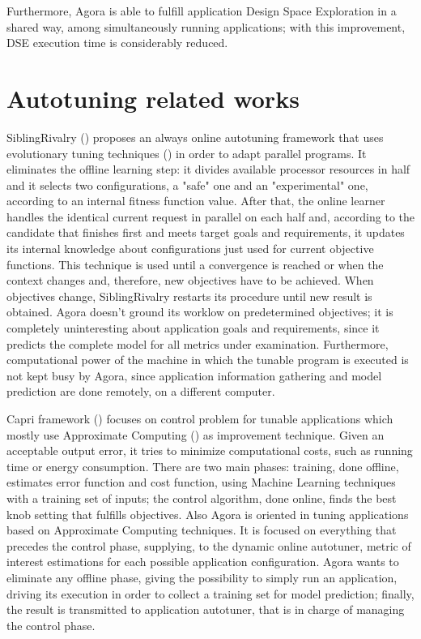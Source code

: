 Furthermore, Agora is able to fulfill application Design Space Exploration in a shared way, among simultaneously running applications; with this improvement, DSE execution time is considerably reduced. 

\section{Autotuning related works}

SiblingRivalry (\cite{ansel2012siblingrivalry}) proposes an always online autotuning framework that uses evolutionary tuning techniques (\cite{coello2007evolutionary}) in order to adapt parallel programs. It eliminates the offline learning step: it divides available processor resources in half and it selects two configurations, a "safe" one and an "experimental" one, according to an internal fitness function value. After that, the online learner handles the identical current request in parallel on each half and, according to the candidate that finishes first and meets target goals and requirements, it updates its internal knowledge about configurations just used for current objective functions. This technique is used until a convergence is reached or when the context changes and, therefore, new objectives have to be achieved. When objectives change, SiblingRivalry restarts its procedure until new result is obtained. Agora doesn't ground its worklow on predetermined objectives; it is completely uninteresting about application goals and requirements, since it predicts the complete model for all metrics under examination. Furthermore, computational power of the machine in which the tunable program is executed is not kept busy by Agora, since application information gathering and model prediction are done remotely, on a different computer.

Capri framework (\cite{sui2016proactive}) focuses on control problem for tunable applications which mostly use Approximate Computing (\cite{mittal2016survey}) as improvement technique. Given an acceptable output error, it tries to minimize computational costs, such as running time or energy consumption. There are two main phases: training, done offline, estimates error function and cost function, using Machine Learning techniques with a training set of inputs; the control algorithm, done online, finds the best knob setting that fulfills objectives. Also Agora is oriented in tuning applications based on Approximate Computing techniques. It is focused on everything that precedes the control phase, supplying, to the dynamic online autotuner, metric of interest estimations for each possible application configuration. Agora wants to eliminate any offline phase, giving the possibility to simply run an application, driving its execution in order to collect a training set for model prediction; finally, the result is transmitted to application autotuner, that is in charge of managing the control phase.

